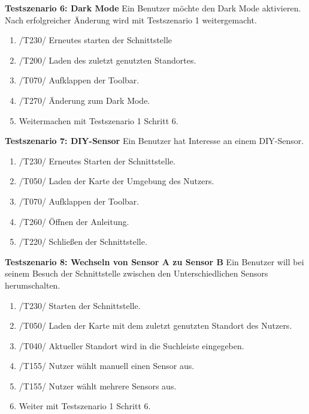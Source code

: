 \textbf{Testszenario 6: Dark Mode}
\newline
Ein Benutzer möchte den Dark Mode aktivieren. Nach erfolgreicher Änderung wird mit Testszenario 1 weitergemacht.
\begin{enumerate} [noitemsep]
    \item /T230/ Erneutes starten der Schnittstelle
    \item /T200/ Laden des zuletzt genutzten Standortes.
    \item /T070/ Aufklappen der \gls{Toolbar}.
    \item /T270/ Änderung zum Dark Mode.
    \item Weitermachen mit Testszenario 1 Schritt 6.
\end{enumerate}

\textbf{Testszenario 7: \gls{DIY}-\gls{Sensor}}
\newline
Ein Benutzer hat Interesse an einem \gls{DIY}-\gls{Sensor}.
\begin{enumerate} [noitemsep]
    \item /T230/ Erneutes Starten der Schnittstelle.
    \item /T050/ Laden der Karte der Umgebung des Nutzers.
    \item /T070/ Aufklappen der \gls{Toolbar}.
    \item /T260/ Öffnen der Anleitung.
    \item /T220/ Schließen der Schnittstelle.
\end{enumerate}

\textbf{Testszenario 8: Wechseln von Sensor A zu Sensor B}
\newline
Ein Benutzer will bei seinem Besuch der Schnittstelle zwischen den Unterschiedlichen \glspl{Sensor} herumschalten. 
\begin{enumerate} [noitemsep]
    \item /T230/ Starten der Schnittstelle.
    \item /T050/ Laden der Karte mit dem zuletzt genutzten Standort des Nutzers.
    \item /T040/ Aktueller Standort wird in die Suchleiste eingegeben.
    \item /T155/ Nutzer wählt manuell einen Sensor aus.
    \item /T155/ Nutzer wählt mehrere \glspl{Sensor} aus.
    \item Weiter mit Testszenario 1 Schritt 6.
\end{enumerate}

